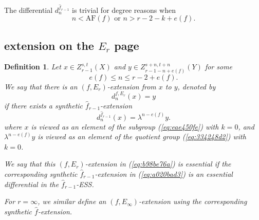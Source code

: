 \documentclass[12pt,a4paper]{article}
\newtheorem{definition}[equation]{Definition}
\newcommand{\AF}{\mathrm{AF}}
\begin{document}
\begin{sloppy}
\paragraph{}
The differential $d^{\hat f_{r-1}}_n$ is trivial for degree reasons when
$$n<\AF(f)\text{ or }n>r-2-k+e(f).$$

\subsection{extension on the $E_r$ page}
\begin{definition}\label{def:6c076a33}
    Let $x\in Z^{s,t}_{r-1}(X)$ and $y\in Z^{s+n,t+n}_{r-1-n+e(f)}(Y)$ for some
    $$e(f)\le n\le r-2+e(f).$$
    We say that there is an $(f,E_r)$-extension from $x$ to $y$, denoted by
    \begin{equation}\label{eq:b98be76a}
    d_{n}^{f,E_r}(x)=y
    \end{equation}
    if there exists a synthetic $\hat f_{r-1}$-extension
    \begin{equation}\label{eq:a020bad3}
        d_{n}^{\hat f_{r-1}}(x)=\lambda^{n-e(f)} y.
    \end{equation}
    where $x$ is viewed as an element of the subgroup (\ref{eq:eae450fe}) with $k=0$, and $\lambda^{n-e(f)} y$ is viewed as an element of the quotient group (\ref{eq:334248d2}) with $k=0$.

   We say that this $(f,E_r)$-extension in (\ref{eq:b98be76a}) is \emph{essential} if the corresponding synthetic $\hat f_{r-1}$-extension in (\ref{eq:a020bad3}) is an essential differential in the $\hat f_{r-1}$-ESS.

    For $r=\infty$, we similar define an $(f,E_\infty)$-extension using the corresponding synthetic $\hat f$-extension.
\end{definition}



\begin{figure}[h]
\end{figure}
\end{sloppy}
\end{document}
